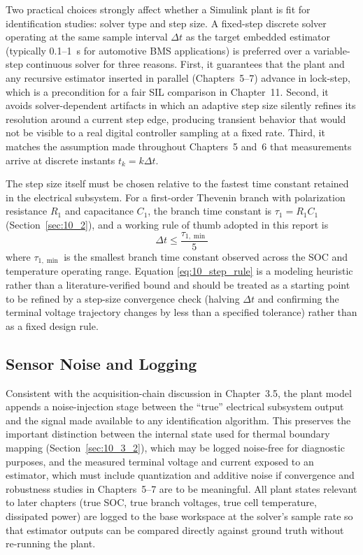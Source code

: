Two practical choices strongly affect whether a Simulink plant is fit
for identification studies: solver type and step size. A fixed-step
discrete solver operating at the same sample interval $\Delta t$ as
the target embedded estimator (typically 0.1--1~s for automotive BMS
applications) is preferred over a variable-step continuous solver for
three reasons. First, it guarantees that the plant and any
recursive estimator inserted in parallel (Chapters~5--7) advance in
lock-step, which is a precondition for a fair SIL comparison in
Chapter~11. Second, it avoids solver-dependent artifacts in which an
adaptive step size silently refines its resolution around a current
step edge, producing transient behavior that would not be visible to
a real digital controller sampling at a fixed rate. Third, it matches
the assumption made throughout Chapters~5 and~6 that measurements
arrive at discrete instants $t_k = k \Delta t$.

The step size itself must be chosen relative to the fastest time
constant retained in the electrical subsystem. For a first-order
Thevenin branch with polarization resistance $R_1$ and capacitance
$C_1$, the branch time constant is $\tau_1 = R_1 C_1$
(Section~\ref{sec:10_2}), and a working rule of thumb adopted in this
report is
\begin{equation}
\Delta t \le \frac{\tau_{1,\min}}{5}
\label{eq:10_step_rule}
\end{equation}
where $\tau_{1,\min}$ is the smallest branch time constant observed
across the SOC and temperature operating range. Equation
\eqref{eq:10_step_rule} is a modeling heuristic rather than a
literature-verified bound and should be treated as a starting point to
be refined by a step-size convergence check (halving $\Delta t$ and
confirming the terminal voltage trajectory changes by less than a
specified tolerance) rather than as a fixed design rule.

\subsection{Sensor Noise and Logging}

Consistent with the acquisition-chain discussion in
Chapter~3.5, the plant model appends a noise-injection stage between
the ``true'' electrical subsystem output and the signal made available
to any identification algorithm. This preserves the important
distinction between the internal state used for thermal boundary
mapping (Section~\ref{sec:10_3_2}), which may be logged noise-free for
diagnostic purposes, and the measured terminal voltage and current
exposed to an estimator, which must include quantization and additive
noise if convergence and robustness studies in Chapters~5--7 are to be
meaningful. All plant states relevant to later chapters (true SOC,
true branch voltages, true cell temperature, dissipated power) are
logged to the base workspace at the solver's sample rate so that
estimator outputs can be compared directly against ground truth
without re-running the plant.

